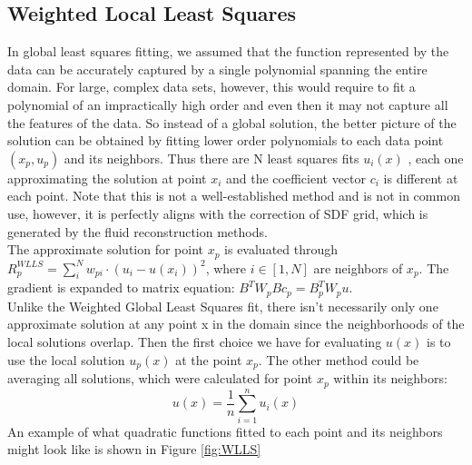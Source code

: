 \subsection{Weighted Local Least Squares}
In global least squares fitting, we assumed that the function represented by the data can be accurately captured by a single polynomial spanning the entire domain. For large, complex data sets, however, this would require to fit a polynomial of an impractically high order and even then it may not capture all the features of the data. So instead of a global solution, the better picture of the solution can be obtained by fitting lower order polynomials to each data point $(x_p, u_p)$ and its neighbors. Thus there are N least squares fits $u_i(x)$ , each one approximating the solution at point $x_i$ and the coefficient vector $c_i$ is different at each point. Note that this is not a well-established method and is not in common use, however, it is perfectly aligns with the correction of SDF grid, which is generated by the fluid reconstruction methods.\\
The approximate solution for point $x_p$ is evaluated through $R^{WLLS}_p = \sum_i^N w_{pi} \cdot (u_i - u(x_i))^2$, where $i\in [1, N]$ are neighbors of $x_p$. The gradient is expanded to matrix equation: $B^T W_p Bc_p = B_p^T W_p u$.\\
Unlike the Weighted Global Least Squares fit, there isn’t necessarily only one approximate solution at any point x in the domain since the neighborhoods of the local solutions overlap. Then the first choice we have for evaluating $u(x)$ is to use the local solution $u_p(x)$ at the point $x_p$. The other method could be averaging all solutions, which were calculated for point $x_p$ within its neighbors:
\begin{equation}
	u(x) = \dfrac{1}{n} \sum_{i=1}^n{u_i(x)}
\end{equation}
An example of what quadratic functions fitted to each point and its neighbors might look like is shown in Figure \ref{fig:WLLS}
